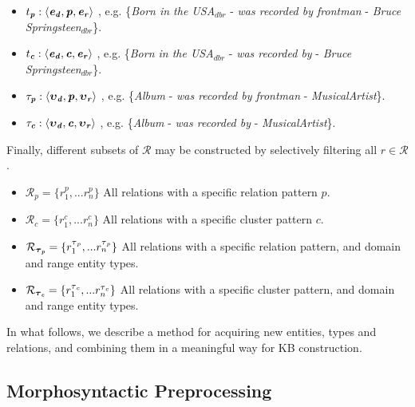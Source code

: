 \begin{itemize}
    \item $t_\textbf{\textit{p}}: \langle \textbf{\textit{e}}{_\textbf{\textit{d}}},\textbf{\textit{p}},\textbf{\textit{e}}{_\textbf{\textit{r}}} \rangle$ , e.g. \{\textit{Born in the USA}$_{dbr}$ - \textit{was recorded by frontman} - \textit{Bruce Springsteen}$_{dbr}$\}.
    \item $t_\textbf{\textit{c}}: \langle \textbf{\textit{e}}{_\textbf{\textit{d}}},\textbf{\textit{c}},\textbf{\textit{e}}{_\textbf{\textit{r}}} \rangle$ , e.g. \{\textit{Born in the USA}$_{dbr}$ - \textit{was recorded by} - \textit{Bruce Springsteen}$_{dbr}$\}.
    \item $\tau_\textbf{\textit{p}}: \langle \boldsymbol\upsilon{_\textbf{\textit{d}}},\textbf{\textit{p}},\boldsymbol\upsilon{_\textbf{\textit{r}}} \rangle$ , e.g. \{\textit{Album} - \textit{was recorded by frontman} - \textit{MusicalArtist}\}.
    \item $\tau_\textbf{\textit{c}}: \langle \boldsymbol\upsilon{_\textbf{\textit{d}}},\textbf{\textit{c}},\boldsymbol\upsilon{_\textbf{\textit{r}}} \rangle$ , e.g. \{\textit{Album} - \textit{was recorded by} - \textit{MusicalArtist}\}.
\end{itemize}

Finally, different subsets of $\mathcal{R}$ may be constructed by selectively filtering all $r \in \mathcal{R}$.  

\begin{itemize}
    \item $\mathcal{R}_{p} = \{r_1^p, ... r_n^p\}$ All relations with a specific relation pattern $p$.
    \item $\mathcal{R}_{c} = \{r_1^c, ... r_n^c\}$ All relations with a specific cluster pattern $c$.
    \item $\mathcal{R}_{\boldsymbol\tau{_\textbf{\textit{p}}}} = \{r_1^{\tau{_p}}, ... r_n^{\tau{_p}}\}$ All relations with a specific relation pattern, and domain and range entity types.
    \item $\mathcal{R}_{\boldsymbol\tau{_\textbf{\textit{c}}}} = \{r_1^{\tau{_c}}, ... r_n^{\tau{_c}}\}$ All relations with a specific cluster pattern, and domain and range entity types.
\end{itemize}

In what follows, we describe a method for acquiring new entities, types and relations, and combining them in a meaningful way for \textsc{KB} construction.


\subsection{Morphosyntactic Preprocessing}\label{sec:method:preprocessing}

